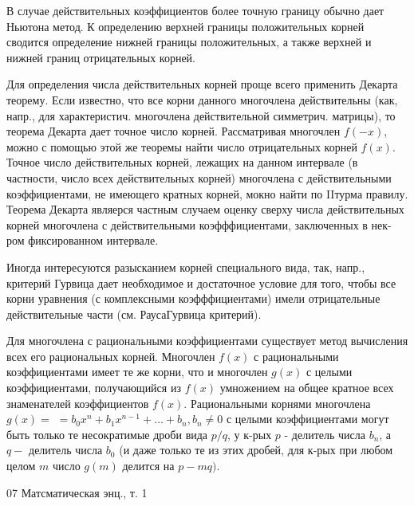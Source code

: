 \documentclass[10pt]{article}
\begin{document}
В случае действительных коэффициентов более точную границу обычно дает Ньютона метод. К определению верхней границы положительных корней сводится определение нижней границы положительных, а также верхней и нижней границ отрицательных корней.



Для определения числа действительных корней проще всего применить Декарта теорему. Если известно, что все корни данного многочлена действительны (как, напр., для характеристич. многочлена действительной симметрич. матрицы), то теорема Декарта дает точное число корней. Рассматривая многочлен $f(-x)$, можно с помощью этой же теоремы найти число отрицательных корней $f(x)$. Точное число действительных корней, лежащих на данном интервале (в частности, число всех действительных корней) многочлена с действительными коэффициентами, не имеющего кратных корней, мокно найти по IIтурма правилу. Теорема Декарта являерся частным случаем оценку сверху числа действительных корней многочлена с действительными коэфффициентами, заключенных в нек-ром фиксированном интервале.



Иногда интересуются разысканием корней специального вида, так, напр., критерий Гурвица дает необходимое и достаточное условие для того, чтобы все корни уравнения (с комплексными коэфффициентами) имели отрицательные действительные части (см. РаусаГурвица критерий).



Для многочлена с рациональными коэффициентами существует метод вычисления всех его рациональных корней. Многочлен $f(x)$ с рациональными коэффициентами имеет те же корни, что и многочлен $g(x)$ с целыми коэффициентами, получающийся из $f(x)$ умножением на общее кратное всех знаменателей коэффициентов $f(x)$. Рациональными корнями многочлена $g(x)=$ $=b_{0} x^{n}+b_{1} x^{n-1}+\ldots+b_{n}, b_{n} \neq 0$ с целыми коэффициентами могут быть только те несократимые дроби вида $p / q$, у к-рых $p$ - делитель числа $b_{n}$, а $q-$ делитель числа $b_{0}$ (и даже только те из этих дробей, для к-рых при любом целом $m$ число $g(m)$ делится на $p-m q)$.



07 Матсматическая энц., т. 1
\end{document}
